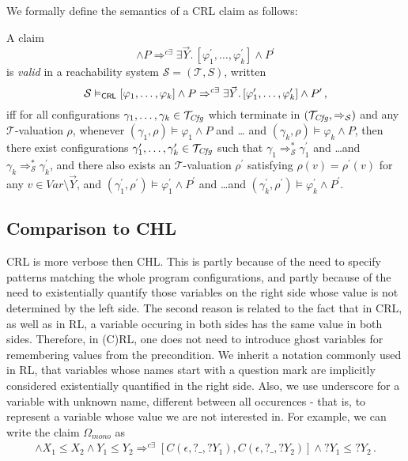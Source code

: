 We formally define the semantics of a CRL claim as follows:
\begin{definition}\label{def:opCRLsemantics}
    A claim
    \begin{equation*}
     [\varphi_1,\ldots,\varphi_k] \land P
     \Rightarrow^{c\exists} \exists \vec{Y}.\, [\varphi^\prime_1,\ldots,\varphi^\prime_k] \land P^\prime
    \end{equation*}
    is \emph{valid} in a reachability system $\mathcal{S} = (\mathcal{T}, S)$,
    written
    \begin{equation*}
        \mathcal{S} \vDash_{\mathsf{CRL}} [\varphi_1,\ldots,\varphi_k] \land P
     \Rightarrow^{c\exists} \exists \vec{Y}.\, [\varphi^\prime_1,\ldots,\varphi^\prime_k] \land P^\prime \, ,
    \end{equation*}
    iff for all configurations $\gamma_1,\ldots,\gamma_k \in \mathcal{T}_{\mathit{Cfg}}$
    which terminate in $(\mathcal{T}_{\mathit{Cfg}}, \Rightarrow_{\mathcal{S}})$
    and any $\mathcal{T}$-valuation $\rho$,
    whenever $(\gamma_1,\rho) \vDash \varphi_1 \land P$ and \ldots
    and $(\gamma_k,\rho) \vDash \varphi_k \land P$,
    then there exist configurations $\gamma_1^\prime,\ldots,\gamma_k^\prime \in \mathcal{T}_{\mathit{Cfg}}$
    such that $\gamma_1 \Rightarrow^{*}_{\mathcal{S}} \gamma_1^\prime$
    and \ldots and $\gamma_k \Rightarrow^{*}_{\mathcal{S}} \gamma_k^\prime$,
    and there also exists an $\mathcal{T}$-valuation $\rho^\prime$
    satisfying $\rho(v) = \rho^\prime(v)$ for any $v \in \mathit{Var} \setminus \vec{Y}$,
    and
    $(\gamma_1^\prime,\rho^\prime) \vDash \varphi^\prime_1 \land P^\prime$ and \ldots and $(\gamma_k^\prime, \rho^\prime) \vDash \varphi^\prime_k \land P^\prime$.
\end{definition}

\subsection{Comparison to CHL}
CRL is more verbose then CHL. This is partly because of the need to specify patterns matching the whole program configurations,
and partly because of the need to existentially quantify those variables on the right side whose value is not
determined by the left side.
The second reason is related to the fact that in CRL, as well as in RL, a variable occuring in both sides
has the same value in both sides.
Therefore, in (C)RL, one does not need to introduce ghost variables for remembering values from the precondition.
We inherit a notation commonly used in RL, that variables whose names start with a question mark are implicitly
considered existentially quantified in the right side.
Also, we use underscore for a variable with unknown name, different between all occurences -
that is, to represent a variable whose value we are not interested in.
For example, we can write the claim $\Omega_{\textit{mono}}$ as
\begin{align*}
[C(P, X_1, Y_1),C(P, X_2, Y_2)] \land X_1 \leq X_2 \land Y_1 \leq Y_2
 \Rightarrow^{c\exists} [C(\epsilon, ?\_, ?Y_1), C(\epsilon, ?\_, ?Y_2)] \land ?Y_1 \leq ?Y_2 \, .
\end{align*}

